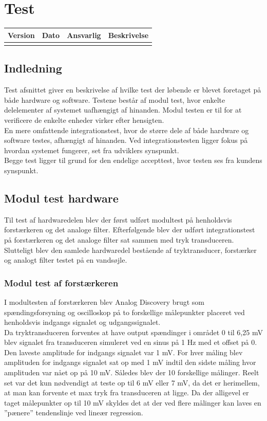 \chapter{Test}\label{Test}
\setcounter{secnumdepth}{5}

\begin{longtabu} to 
    Version &    Dato &    Ansvarlig &    Beskrivelse\\[-1ex]
    \midrule
\label{version_Systemark}
\end{longtabu}

\section{Indledning} 
Test afsnittet giver en beskrivelse af hvilke test der løbende er blevet foretaget på både hardware og software. Testene består af modul test, hvor enkelte delelementer af systemet uafhængigt af hinanden. Modul testen er til for at verificere de enkelte enheder virker efter hensigten.\\
En mere omfattende integrationstest, hvor de større dele af både hardware og software testes, afhængigt af hinanden. Ved integrationstesten ligger fokus på hvordan systemet fungerer, set fra udviklers synspunkt.\\ Begge test ligger til grund for den endelige accepttest, hvor testen ses fra kundens synspunkt.

\section{Modul test hardware}\label{ModulHard}

Til test af hardwaredelen blev der først udført modultest på henholdsvis forstærkeren og det analoge filter. Efterfølgende blev der udført integrationstest på forstærkeren og det analoge filter sat sammen med tryk transduceren. Slutteligt blev den samlede hardwaredel bestående af tryktransducer, forstærker og analogt filter testet på en vandsøjle.

\subsection{Modul test af forstærkeren}
I modultesten af forstærkeren blev Analog Discovery brugt som spændingsforsyning og oscilloskop på to forskellige målepunkter placeret ved henholdsvis indgangs signalet og udgangssignalet.\\
Da tryktransduceren forventes at have output spændinger i området 0 til 6,25 mV blev signalet fra transduceren simuleret ved en sinus på 1 Hz med et offset på 0. Den laveste amplitude for indgangs signalet var 1 mV. For hver måling blev amplituden for indgangs signalet sat op med 1 mV indtil den sidste måling hvor amplituden var nået op på 10 mV. Således blev der 10 forskellige målinger. Reelt set var det kun nødvendigt at teste op til 6 mV eller 7 mV, da det er herimellem, at man kan forvente et max tryk fra transduceren at ligge. Da der alligevel er taget målepunkter op til 10 mV skyldes det at der ved flere målinger kan laves en ”pænere” tendenslinje ved lineær regression.

